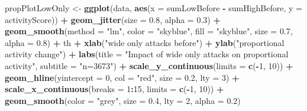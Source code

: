 \documentclass[10pt,]{scrartcl}
\newenvironment{Shaded}{\begin{snugshade}}{\end{snugshade}}
\newcommand{\KeywordTok}[1]{\textcolor[rgb]{0.13,0.29,0.53}{\textbf{#1}}}
\newcommand{\DataTypeTok}[1]{\textcolor[rgb]{0.13,0.29,0.53}{#1}}
\newcommand{\DecValTok}[1]{\textcolor[rgb]{0.00,0.00,0.81}{#1}}
\newcommand{\FloatTok}[1]{\textcolor[rgb]{0.00,0.00,0.81}{#1}}
\newcommand{\StringTok}[1]{\textcolor[rgb]{0.31,0.60,0.02}{#1}}
\newcommand{\OperatorTok}[1]{\textcolor[rgb]{0.81,0.36,0.00}{\textbf{#1}}}
\newcommand{\NormalTok}[1]{#1}
\begin{document}
\begin{Shaded}
\begin{Highlighting}[]
\NormalTok{propPlotLowOnly <-}\StringTok{ }\KeywordTok{ggplot}\NormalTok{(data, }\KeywordTok{aes}\NormalTok{(}\DataTypeTok{x =}\NormalTok{ sumLowBefore }\OperatorTok{-}\StringTok{ }\NormalTok{sumHighBefore,}
    \DataTypeTok{y =}\NormalTok{ activityScore)) }\OperatorTok{+}\StringTok{ }\KeywordTok{geom_jitter}\NormalTok{(}\DataTypeTok{size =} \FloatTok{0.8}\NormalTok{, }\DataTypeTok{alpha =} \FloatTok{0.3}\NormalTok{) }\OperatorTok{+}
\StringTok{    }\KeywordTok{geom_smooth}\NormalTok{(}\DataTypeTok{method =} \StringTok{"lm"}\NormalTok{, }\DataTypeTok{color =} \StringTok{"skyblue"}\NormalTok{, }\DataTypeTok{fill =} \StringTok{"skyblue"}\NormalTok{,}
        \DataTypeTok{size =} \FloatTok{0.7}\NormalTok{, }\DataTypeTok{alpha =} \FloatTok{0.8}\NormalTok{) }\OperatorTok{+}\StringTok{ }\NormalTok{th }\OperatorTok{+}\StringTok{ }\KeywordTok{xlab}\NormalTok{(}\StringTok{"wide only attacks before"}\NormalTok{) }\OperatorTok{+}
\StringTok{    }\KeywordTok{ylab}\NormalTok{(}\StringTok{"proportional activity change"}\NormalTok{) }\OperatorTok{+}\StringTok{ }\KeywordTok{labs}\NormalTok{(}\DataTypeTok{title =} \StringTok{"Impact of wide only attacks on proportional activity"}\NormalTok{,}
    \DataTypeTok{subtitle =} \StringTok{"n=3673"}\NormalTok{) }\OperatorTok{+}\StringTok{ }\KeywordTok{scale_y_continuous}\NormalTok{(}\DataTypeTok{limits =} \KeywordTok{c}\NormalTok{(}\OperatorTok{-}\DecValTok{1}\NormalTok{,}
    \DecValTok{10}\NormalTok{)) }\OperatorTok{+}\StringTok{ }\KeywordTok{geom_hline}\NormalTok{(}\DataTypeTok{yintercept =} \DecValTok{0}\NormalTok{, }\DataTypeTok{col =} \StringTok{"red"}\NormalTok{, }\DataTypeTok{size =} \FloatTok{0.2}\NormalTok{,}
    \DataTypeTok{lty =} \DecValTok{3}\NormalTok{) }\OperatorTok{+}\StringTok{ }\KeywordTok{scale_x_continuous}\NormalTok{(}\DataTypeTok{breaks =} \DecValTok{1}\OperatorTok{:}\DecValTok{15}\NormalTok{, }\DataTypeTok{limits =} \KeywordTok{c}\NormalTok{(}\OperatorTok{-}\DecValTok{1}\NormalTok{,}
    \DecValTok{10}\NormalTok{)) }\OperatorTok{+}\StringTok{ }\KeywordTok{geom_smooth}\NormalTok{(}\DataTypeTok{color =} \StringTok{"grey"}\NormalTok{, }\DataTypeTok{size =} \FloatTok{0.4}\NormalTok{, }\DataTypeTok{lty =} \DecValTok{2}\NormalTok{, }\DataTypeTok{alpha =} \FloatTok{0.2}\NormalTok{)}
\end{Highlighting}
\end{Shaded}

\normalsize
\end{document}

